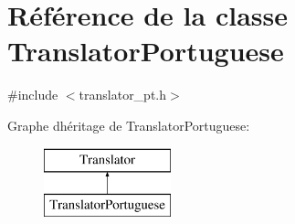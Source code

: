 \hypertarget{class_translator_portuguese}{}\section{Référence de la classe Translator\+Portuguese}
\label{class_translator_portuguese}


{\ttfamily \#include $<$translator\+\_\+pt.\+h$>$}

Graphe d\textquotesingle{}héritage de Translator\+Portuguese\+:\begin{figure}[H]
\begin{center}
\leavevmode
\includegraphics[height=2.000000cm]{class_translator_portuguese}
\end{center}
\end{figure}
